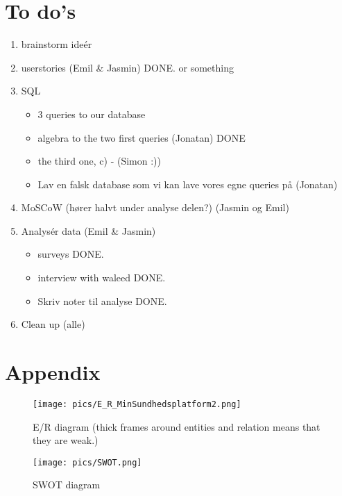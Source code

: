 \documentclass[a4paper,11pt]{article}
\begin{document}
\section{To do's}
\begin{enumerate}
    \item brainstorm ideér
    \item userstories (Emil & Jasmin) DONE. or something
    \item SQL %
    \begin{itemize}
        \item 3 queries to our database
        \item algebra to the two first queries (Jonatan) DONE
        \item the third one, c) - (Simon :))
        \item Lav en falsk database som vi kan lave vores egne queries på (Jonatan)
    \end{itemize}{}
    \item MoSCoW (hører halvt under analyse delen?) (Jasmin og Emil)
    \item Analysér data (Emil \& Jasmin)
    \begin{itemize}
        \item surveys DONE.
        \item interview with waleed DONE.
        \item Skriv noter til analyse DONE.
    \end{itemize}
    \item Clean up (alle)
\end{enumerate}


\section{}
\section{Appendix}
\begin{figure}[H]
    \centering
    \texttt{[image: pics/E\_R\_MinSundhedsplatform2.png]}
    \caption{E/R diagram (thick frames around entities and relation means that they are weak.)}
    \label{fig:er}
\end{figure}

\begin{figure}[H]
    \centering
    \texttt{[image: pics/SWOT.png]}
    \caption{SWOT diagram}
    \label{fig:er}
\end{figure}
\end{document}
